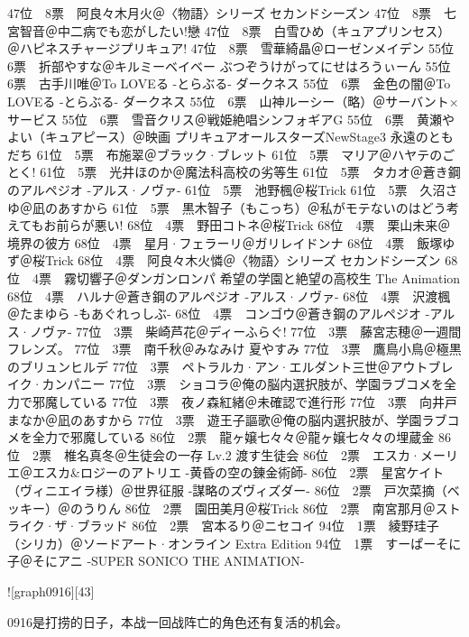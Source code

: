     47位　8票　阿良々木月火＠〈物語〉シリーズ セカンドシーズン
    47位　8票　七宮智音＠中二病でも恋がしたい!戀
    47位　8票　白雪ひめ（キュアプリンセス）＠ハピネスチャージプリキュア!
    47位　8票　雪華綺晶＠ローゼンメイデン
    55位　6票　折部やすな＠キルミーベイベー ぶつぞうけがってにせはろうぃーん
    55位　6票　古手川唯＠To LOVEる -とらぶる- ダークネス
    55位　6票　金色の闇＠To LOVEる -とらぶる- ダークネス
    55位　6票　山神ルーシー（略）＠サーバント×サービス
    55位　6票　雪音クリス＠戦姫絶唱シンフォギアG
    55位　6票　黄瀬やよい（キュアピース）＠映画 プリキュアオールスターズNewStage3 永遠のともだち
    61位　5票　布施翠＠ブラック·ブレット
    61位　5票　マリア＠ハヤテのごとく!
    61位　5票　光井ほのか＠魔法科高校の劣等生
    61位　5票　タカオ＠蒼き鋼のアルペジオ -アルス·ノヴァ-
    61位　5票　池野楓＠桜Trick
    61位　5票　久沼さゆ＠凪のあすから
    61位　5票　黒木智子（もこっち）＠私がモテないのはどう考えてもお前らが悪い!
    68位　4票　野田コトネ＠桜Trick
    68位　4票　栗山未来＠境界の彼方
    68位　4票　星月·フェラーリ＠ガリレイドンナ
    68位　4票　飯塚ゆず＠桜Trick
    68位　4票　阿良々木火憐＠〈物語〉シリーズ セカンドシーズン
    68位　4票　霧切響子＠ダンガンロンパ 希望の学園と絶望の高校生 The Animation
    68位　4票　ハルナ＠蒼き鋼のアルペジオ -アルス·ノヴァ-
    68位　4票　沢渡楓＠たまゆら -もあぐれっしぶ-
    68位　4票　コンゴウ＠蒼き鋼のアルペジオ -アルス·ノヴァ-
    77位　3票　柴崎芦花＠ディーふらぐ!
    77位　3票　藤宮志穂＠一週間フレンズ。
    77位　3票　南千秋＠みなみけ 夏やすみ
    77位　3票　鷹鳥小鳥＠極黒のブリュンヒルデ
    77位　3票　ペトラルカ·アン·エルダント三世＠アウトブレイク·カンパニー
    77位　3票　ショコラ＠俺の脳内選択肢が、学園ラブコメを全力で邪魔している
    77位　3票　夜ノ森紅緒＠未確認で進行形
    77位　3票　向井戸まなか＠凪のあすから
    77位　3票　遊王子謳歌＠俺の脳内選択肢が、学園ラブコメを全力で邪魔している
    86位　2票　龍ヶ嬢七々々＠龍ヶ嬢七々々の埋蔵金
    86位　2票　椎名真冬＠生徒会の一存 Lv.2 渡す生徒会
    86位　2票　エスカ·メーリエ＠エスカ\&ロジーのアトリエ -黄昏の空の錬金術師-
    86位　2票　星宮ケイト（ヴィニエイラ様）＠世界征服 -謀略のズヴィズダー-
    86位　2票　戸次菜摘（ベッキー）＠のうりん
    86位　2票　園田美月＠桜Trick
    86位　2票　南宮那月＠ストライク·ザ·ブラッド
    86位　2票　宮本るり＠ニセコイ
    94位　1票　綾野珪子（シリカ）＠ソードアート·オンライン Extra Edition
    94位　1票　すーぱーそに子＠そにアニ -SUPER SONICO THE ANIMATION-

![graph0916][43]

0916是打捞的日子，本战一回战阵亡的角色还有复活的机会。

